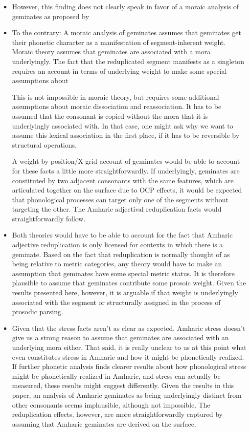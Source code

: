 \documentclass[12pt]{article}
\begin{document}
\begin{itemize}
	\item However, this finding does not clearly speak in favor of a moraic analysis of geminates as proposed by \cite{sande-hedding14}
	\item To the contrary: A moraic analysis of geminates assumes that geminates get their phonetic character as a manifestation of segment-inherent weight. Moraic theory assumes that geminates are associated with a mora underlyingly. The fact that the reduplicated segment manifests as a singleton requires an account in terms of underlying weight to make some special assumptions about 

	This is not impossible in moraic theory, but requires some additional assumptions about moraic dissociation and reassociation. It has to be assumed that the consonant is copied without the mora that it is underlyingly associated with. In that case, one might ask why we want to assume this lexical association in the first place, if it has to be reversible by structural operations.

	A weight-by-position/X-grid account of geminates would be able to account for these facts a little more straightforwardly. If underlyingly, geminates are constituted by two adjacent consonants with the same features, which are articulated together on the surface due to OCP effects, it would be expected that phonological processes can target only one of the segments without targeting the other. The Amharic adjectival reduplication facts would straightforwardly follow.

	\item Both theories would have to be able to account for the fact that Amharic adjective reduplication is only licensed for contexts in which there is a geminate. Based on the fact that reduplication is normally thought of as being relative to metric categories, any theory would have to make an assumption that geminates have some special metric status. It is therefore plausible to assume that geminates contribute some prosoic weight. Given the results presented  here, however, it is arguable if that weight is underlyingly associated with the segment or structurally assigned in the process of prosodic parsing.

	\item Given that the stress facts aren't as clear as expected, Amharic stress doesn't give us a strong reason to assume that geminates are associated with an underlying mora either. That said, it is really unclear to us at this point what even constitutes stress in Amharic and how it might be phonetically realized. If further phonetic analysis finds clearer results about how phonological stress might be phonetically realized in Amharic, and stress can actually be measured, these results might suggest differently. Given the results in this paper, an analysis of Amharic geminates as being underlyingly distinct from other consonants seems implausible, although not impossible. The reduplication effects, however, are more straightforwardly captured by assuming that Amharic geminates are derived on the surface.

\end{itemize}





\end{document}
